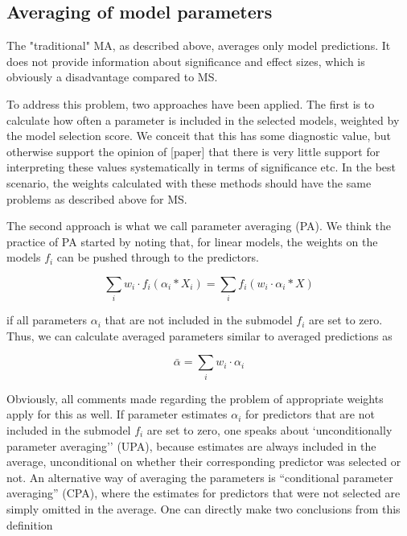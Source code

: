 \documentclass[5p]{elsarticle}
\begin{document}
\subsection{Averaging of model parameters}

The "traditional" MA, as described above, averages only model predictions. It does not provide information about significance and effect sizes, which is obviously a disadvantage compared to MS. 

To address this problem, two approaches have been applied. The first is to calculate how often a parameter is included in the selected models, weighted by the model selection score. We conceit that this has some diagnostic value, but otherwise support the opinion of [paper] that there is very little support for interpreting these values systematically in terms of significance etc. In the best scenario, the weights calculated with these methods should have the same problems as described above for MS.

The second approach is what we call parameter averaging (PA). We think the practice of PA started by noting that, for linear models, the weights on the models $f_i$ can be pushed through to the predictors. 

\begin{equation}
 \sum_i w_i \cdot  f_i(\alpha_i * X_i) = \sum_i f_i(w_i \cdot \alpha_i * X)
\label{eq: motivation parameter averaging}
\end{equation}

if all parameters $\alpha_i$ that are not included in the submodel $f_i$ are set to zero. Thus, we can calculate averaged parameters similar to averaged predictions as

\begin{equation}
 \bar{\alpha} = \sum_i w_i \cdot \alpha_i 
\label{eq: averaged parameters }
\end{equation}

Obviously, all comments made regarding the problem of appropriate weights apply for this as well. If parameter estimates $\alpha_i$ for predictors that are not included in the submodel $f_i$ are set to zero, one speaks about `unconditionally parameter averaging'' (UPA), because estimates are always included in the average, unconditional on whether their corresponding predictor was selected or not. An alternative way of averaging the parameters is ``conditional parameter averaging'' (CPA), where the estimates for predictors that were not selected are simply omitted in the average. One can directly make two conclusions from this definition 
\end{document}
